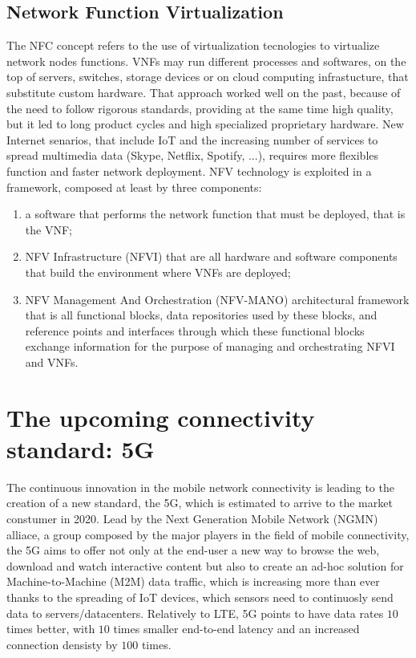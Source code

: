 \subsection{Network Function Virtualization}
The NFC concept refers to the use of virtualization tecnologies to virtualize
network nodes functions. VNFs may run different processes and softwares, on the
top of servers, switches, storage devices or on cloud computing infrastucture,
that substitute custom hardware. That approach worked well on the past, because
of the need to follow rigorous standards, providing at the same time high
quality, but it led to long product cycles and high specialized proprietary
hardware. New Internet senarios, that include IoT and the increasing number of
services to spread multimedia data (Skype, Netflix, Spotify, ...), requires
more flexibles function and faster network deployment. NFV technology is
exploited in a framework, composed at least by three components:
\begin{enumerate}
 \item a software that performs the network function that must be deployed,
 that is the VNF;
 \item NFV Infrastructure (NFVI) that are all hardware and software components
 that build the environment where VNFs are deployed;
 \item NFV Management And Orchestration (NFV-MANO) architectural framework that
 is all functional blocks, data repositories used by these blocks, and
 reference points and interfaces through which these functional blocks exchange
 information for the purpose of managing and orchestrating NFVI and VNFs.
\end{enumerate}

\section{The upcoming connectivity standard: 5G}
The continuous innovation in the mobile network connectivity is leading to the
creation of a new standard, the 5G, which is estimated to arrive to the market
constumer in 2020. Lead by the Next Generation Mobile Network (NGMN)
alliace, a group composed by the major players in the field of mobile
connectivity, the 5G aims to offer not only at the end-user a new way to browse 
the web,
download and watch interactive content but also to create an ad-hoc solution 
for Machine-to-Machine (M2M) data traffic, which is increasing more than ever 
thanks to the spreading of IoT devices, which sensors need to continuosly send 
data to servers/datacenters. Relatively to LTE, 5G points 
to have data rates $10$ times better, with $10$ times smaller end-to-end 
latency and an increased connection densisty by $100$ times.

